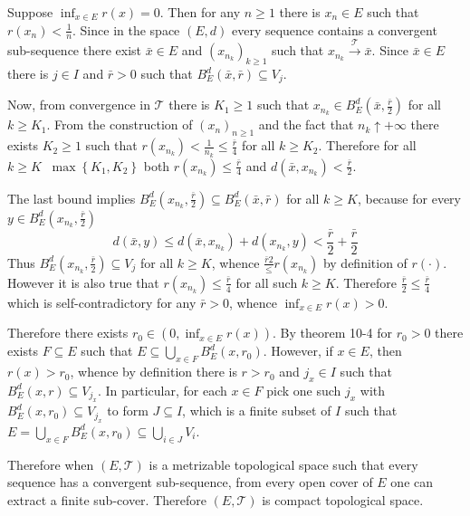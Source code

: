 \documentclass[a4paper]{article}
\newcommand{\obj}[1]{\left\{ #1 \right \}}
\newcommand{\brac}[1]{\left ( #1 \right )}
\newcommand{\Tcal}{\mathcal{T}}
\newcommand{\defn}{\mathop{\overset{\Delta}{=}}\nolimits}
\begin{document}
Suppose $\inf_{x\in E} r\brac{x} = 0$. Then for any $n\geq 1$ there is $x_n\in E$ such that $r\brac{x_n}<\frac{1}{n}$. Since in the space $\brac{E, d}$ every sequence contains a convergent sub-sequence there exist $\bar{x}\in E$ and $\brac{x_{n_k}}_{k\geq 1}$ such that $x_{n_k}\overset{\Tcal}{\to} \bar{x}$. Since $\bar{x}\in E$ there is $j\in I$ and $\bar{r}>0$ such that $B^d_E\brac{\bar{x}, \bar{r}}\subseteq V_j$.

Now, from convergence in $\Tcal$ there is $K_1\geq 1$ such that $x_{n_k}\in B^d_E\brac{\bar{x},\frac{\bar{r}}{2}}$ for all $k\geq K_1$. From the construction of $\brac{x_n}_{n\geq 1}$ and the fact that $n_k\uparrow +\infty$ there exists $K_2 \geq 1$ such that $r\brac{x_{n_k}} < \frac{1}{n_k} \leq \frac{\bar{r}}{4}$ for all $k\geq K_2$. Therefore for all $k\geq K\defn \max\obj{K_1, K_2}$ both $r\brac{x_{n_k}} \leq \frac{\bar{r}}{4}$ and $d\brac{\bar{x},x_{n_k}} < \frac{\bar{r}}{2}$.

The last bound implies $B^d_E\brac{x_{n_k}, \frac{\bar{r}}{2}}\subseteq B^d_E\brac{\bar{x}, \bar{r}}$ for all $k\geq K$, because for every $y\in B^d_E\brac{x_{n_k}, \frac{\bar{r}}{2}}$ \[d\brac{\bar{x},y}\leq d\brac{\bar{x},x_{n_k}} + d\brac{x_{n_k},y} < \frac{\bar{r}}{2} + \frac{\bar{r}}{2} \] Thus $B^d_E\brac{x_{n_k}, \frac{\bar{r}}{2}}\subseteq V_j$ for all $k\geq K$, whence $\frac{\bar{r}{2}}\leq r\brac{x_{n_k}}$ by definition of $r\brac{\cdot}$. However it is also true that $r\brac{x_{n_k}} \leq \frac{\bar{r}}{4}$ for all such $k\geq K$. Therefore $\frac{\bar{r}}{2}\leq \frac{\bar{r}}{4}$ which is self-contradictory for any $\bar{r}>0$, whence $\inf_{x\in E} r\brac{x} > 0$.

Therefore there exists $r_0\in \brac{0,\inf_{x\in E} r\brac{x}}$. By theorem 10-4 for $r_0>0$ there exists $F\subseteq E$ such that $E\subseteq \bigcup_{x\in F} B^d_E\brac{x, r_0}$. However, if $x\in E$, then $r\brac{x}>r_0$, whence by definition there is $r>r_0$ and $j_x\in I$ such that $B^d_E\brac{x, r}\subseteq V_{j_x}$. In particular, for each $x\in F$ pick one such $j_x$ with $B^d_E\brac{x, r_0}\subseteq V_{j_x}$ to form $J\subseteq I$, which is a finite subset of $I$ such that $E=\bigcup_{x\in F} B^d_E\brac{x, r_0} \subseteq \bigcup_{i\in J} V_i$.

Therefore when $\brac{E, \Tcal}$ is a metrizable topological space such that every sequence has a convergent sub-sequence, from every open cover of $E$ one can extract a finite sub-cover. Therefore $\brac{E, \Tcal}$ is compact topological space.\\
\end{document}
